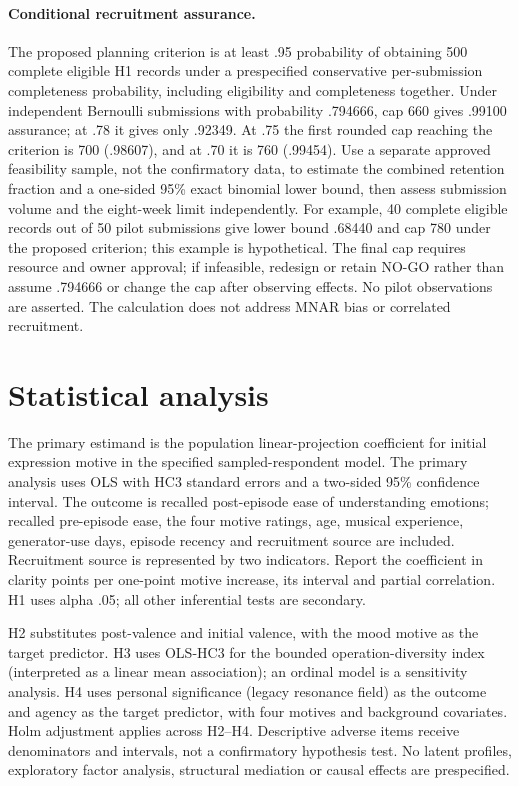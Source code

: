 \documentclass[11pt,a4paper]{article}
\begin{document}
\paragraph{Conditional recruitment assurance.}
The proposed planning criterion is at least .95 probability of obtaining 500 complete eligible H1 records under a prespecified conservative per-submission completeness probability, including eligibility and completeness together. Under independent Bernoulli submissions with probability .794666, cap 660 gives .99100 assurance; at .78 it gives only .92349. At .75 the first rounded cap reaching the criterion is 700 (.98607), and at .70 it is 760 (.99454). Use a separate approved feasibility sample, not the confirmatory data, to estimate the combined retention fraction and a one-sided 95\% exact binomial lower bound, then assess submission volume and the eight-week limit independently. For example, 40 complete eligible records out of 50 pilot submissions give lower bound .68440 and cap 780 under the proposed criterion; this example is hypothetical. The final cap requires resource and owner approval; if infeasible, redesign or retain NO-GO rather than assume .794666 or change the cap after observing effects. No pilot observations are asserted. The calculation does not address MNAR bias or correlated recruitment.

\section{Statistical analysis}
The primary estimand is the population linear-projection coefficient for initial expression motive in the specified sampled-respondent model. The primary analysis uses OLS with HC3 standard errors and a two-sided 95\% confidence interval. The outcome is recalled post-episode ease of understanding emotions; recalled pre-episode ease, the four motive ratings, age, musical experience, generator-use days, episode recency and recruitment source are included. Recruitment source is represented by two indicators. Report the coefficient in clarity points per one-point motive increase, its interval and partial correlation. H1 uses alpha .05; all other inferential tests are secondary.

H2 substitutes post-valence and initial valence, with the mood motive as the target predictor. H3 uses OLS-HC3 for the bounded operation-diversity index (interpreted as a linear mean association); an ordinal model is a sensitivity analysis. H4 uses personal significance (legacy resonance field) as the outcome and agency as the target predictor, with four motives and background covariates. Holm adjustment applies across H2--H4. Descriptive adverse items receive denominators and intervals, not a confirmatory hypothesis test. No latent profiles, exploratory factor analysis, structural mediation or causal effects are prespecified.
\end{document}
